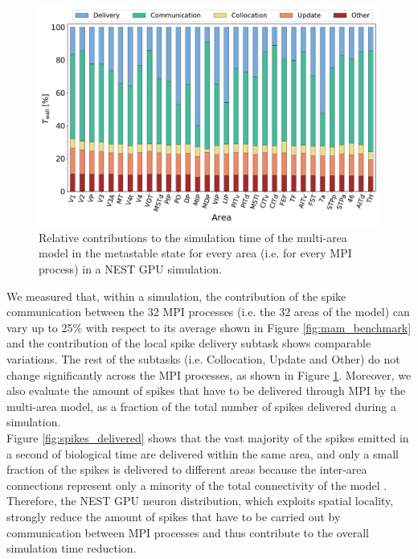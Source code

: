 \documentclass[a4paper, 12pt, twoside, openright]{book}
\begin{document}
\begin{figure}[h]
    \centering
    \includegraphics[width=\columnwidth]{figures/mam_sim_contributions.pdf}
    \caption{Relative contributions to the simulation time of the multi-area model in the metastable state for every area (i.e. for every MPI process) in a NEST GPU simulation.}
    \label{fig:mam_relative_contrib_sim_time}
\end{figure}

We measured that, within a simulation, the contribution of the spike communication between the 32 MPI processes (i.e. the 32 areas of the model) can vary up to 25\% with respect to its average shown in Figure \ref{fig:mam_benchmark} and the contribution of the local spike delivery subtask shows comparable variations. The rest of the subtasks (i.e. Collocation, Update and Other) do not change significantly across the MPI processes, as shown in Figure \ref{fig:mam_relative_contrib_sim_time}.
Moreover, we also evaluate the amount of spikes that have to be delivered through MPI by the multi-area model, as a fraction of the total number of spikes delivered during a simulation.\\
Figure \ref{fig:spikes_delivered} shows that the vast majority of the spikes emitted in a second of biological time are delivered within the same area, and only a small fraction of the spikes is delivered to different areas because the inter-area connections represent only a minority of the total connectivity of the model \cite{Schmidt2018}. Therefore, the NEST GPU neuron distribution, which exploits spatial locality, strongly reduce the amount of spikes that have to be carried out by communication between MPI processes and thus contribute to the
overall simulation time reduction.
\end{document}

